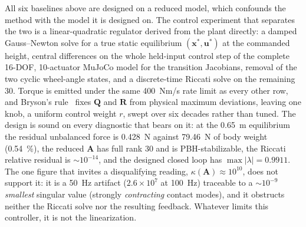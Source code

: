 \documentclass[conference]{IEEEtran}
\begin{document}
All six baselines above are designed on a reduced model, which confounds the method with the model it is designed on. The control experiment that separates the two is a linear-quadratic regulator derived from the plant directly: a damped Gauss--Newton solve for a true static equilibrium $(\mathbf{x}^\ast,\mathbf{u}^\ast)$ at the commanded height, central differences on the whole held-input control step of the complete 16-DOF, 10-actuator MuJoCo model for the transition Jacobians, removal of the two cyclic wheel-angle states, and a discrete-time Riccati solve on the remaining \num{30}. Torque is emitted under the same \SI{400}{Nm/s} rate limit as every other row, and Bryson's rule~\cite{bryson1975optimal} fixes $\mathbf{Q}$ and $\mathbf{R}$ from physical maximum deviations, leaving one knob, a uniform control weight $r$, swept over six decades rather than tuned. The design is sound on every diagnostic that bears on it: at the \SI{0.65}{m} equilibrium the residual unbalanced force is \SI{0.428}{N} against \SI{79.46}{N} of body weight (\SI{0.54}{\percent}), the reduced $\mathbf{A}$ has full rank \num{30} and is PBH-stabilizable, the Riccati relative residual is ${\sim}10^{-14}$, and the designed closed loop has $\max|\lambda|{=}0.9911$. The one figure that invites a disqualifying reading, $\kappa(\mathbf{A}){\approx}10^{10}$, does not support it: it is a \SI{50}{Hz} artifact ($2.6{\times}10^{7}$ at \SI{100}{Hz}) traceable to a ${\sim}10^{-9}$ \emph{smallest} singular value (strongly \emph{contracting} contact modes), and it obstructs neither the Riccati solve nor the resulting feedback. Whatever limits this controller, it is not the linearization.
\end{document}
